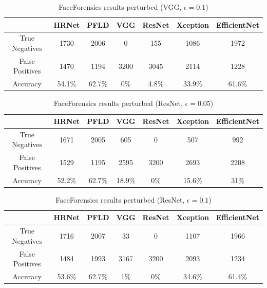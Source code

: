 \begin{table}[H]
    \centering
    \begin{tabular}{|c|c|c|c|c|c|c|}
        \hline
        \textbf{} & \textbf{HRNet} & \textbf{PFLD} &  \textbf{VGG} & \textbf{ResNet} & \textbf{Xception} & \textbf{EfficientNet} \\
        \hline
        True Negatives & 1730 & 2006 & 0 & 155 & 1086 & 1972\\
        \hline
        False Positives & 1470 & 1194 & 3200 & 3045 & 2114 & 1228\\
        \hline
        Accuracy & 54.1\% & 62.7\% & 0\% & 4.8\% & 33.9\% & 61.6\% \\
        \hline
    \end{tabular}
    \caption{FaceForensics results perturbed (VGG, $\epsilon = 0.1$)}
    \label{tab:ff-vgg-1}
\end{table}

\begin{table}[H]
    \centering
    \begin{tabular}{|c|c|c|c|c|c|c|}
        \hline
        \textbf{} & \textbf{HRNet} & \textbf{PFLD} &  \textbf{VGG} & \textbf{ResNet} & \textbf{Xception} & \textbf{EfficientNet} \\
        \hline
        True Negatives & 1671 & 2005 & 605 & 0 & 507 & 992\\
        \hline
        False Positives & 1529 & 1195 & 2595 & 3200 & 2693 & 2208\\
        \hline
        Accuracy & 52.2\% & 62.7\% & 18.9\% & 0\% & 15.6\% & 31\% \\
        \hline
    \end{tabular}
    \caption{FaceForensics results perturbed (ResNet, $\epsilon=0.05$)}
    \label{tab:ff-res-5}
\end{table}

\begin{table}[H]
    \centering
    \begin{tabular}{|c|c|c|c|c|c|c|}
        \hline
        \textbf{} & \textbf{HRNet} & \textbf{PFLD} &  \textbf{VGG} & \textbf{ResNet} & \textbf{Xception} & \textbf{EfficientNet} \\
        \hline
        True Negatives & 1716 & 2007 & 33 & 0 & 1107 & 1966\\
        \hline
        False Positives & 1484 & 1993 & 3167 & 3200 & 2093 & 1234\\
        \hline
        Accuracy & 53.6\% & 62.7\% & 1\% & 0\% & 34.6\% & 61.4\% \\
        \hline
    \end{tabular}
    \caption{FaceForensics results perturbed (ResNet, $\epsilon=0.1$)}
    \label{tab:ff-res-1}
\end{table}

